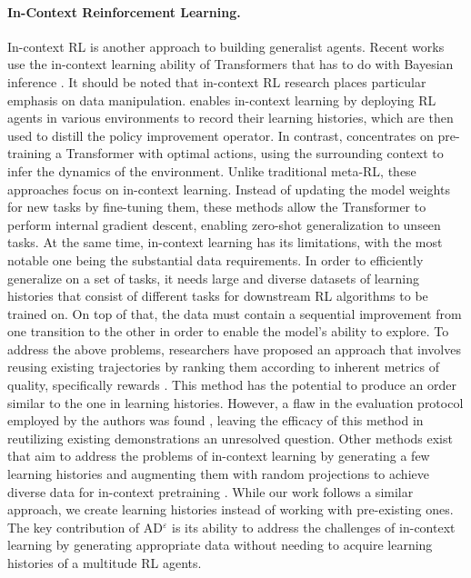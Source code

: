 \documentclass{article}
\theoremstyle{plain}
\theoremstyle{definition}
\theoremstyle{remark}
\begin{document}
\paragraph{In-Context Reinforcement Learning.}
In-context RL is another approach to building generalist agents. Recent works use the in-context learning ability of Transformers \cite{von2023transformers, dai2022can, wei2022emergent} that has to do with Bayesian inference \cite{muller2021transformers, xie2021explanation}. It should be noted that in-context RL research places particular emphasis on data manipulation. \citet{laskin2022context} enables in-context learning by deploying RL agents in various environments to record their learning histories, which are then used to distill the policy improvement operator. In contrast, \citet{lee2023supervised} concentrates on pre-training a Transformer with optimal actions, using the surrounding context to infer the dynamics of the environment. Unlike traditional meta-RL, these approaches focus on in-context learning. Instead of updating the model weights for new tasks by fine-tuning them, these methods allow the Transformer to perform internal gradient descent, enabling zero-shot generalization to unseen tasks.
At the same time, in-context learning has its limitations, with the most notable one being the substantial data requirements. In order to efficiently generalize on a set of tasks, it needs large and diverse datasets of learning histories that consist of different tasks for downstream RL algorithms to be trained on. On top of that, the data must contain a sequential improvement from one transition to the other in order to enable the model's ability to explore. To address the above problems, researchers have proposed an approach that involves reusing existing trajectories by ranking them according to inherent metrics of quality, specifically rewards \cite{liu2023emergent}. This method has the potential to produce an order similar to the one in learning histories. However, a flaw in the evaluation protocol employed by the authors was found \cite{zisman2023agentic}, leaving the efficacy of this method in reutilizing existing demonstrations an unresolved question. Other methods exist that aim to address the problems of in-context learning by generating a few learning histories and augmenting them with random projections to achieve diverse data for in-context pretraining \cite{kirsch2023towards, kirsch2022generalpurpose}. While our work follows a similar approach, we create learning histories instead of working with pre-existing ones. The key contribution of AD$^\varepsilon$ is its ability to address the challenges of in-context learning by generating appropriate data without needing to acquire learning histories of a multitude RL agents.
\end{document}
